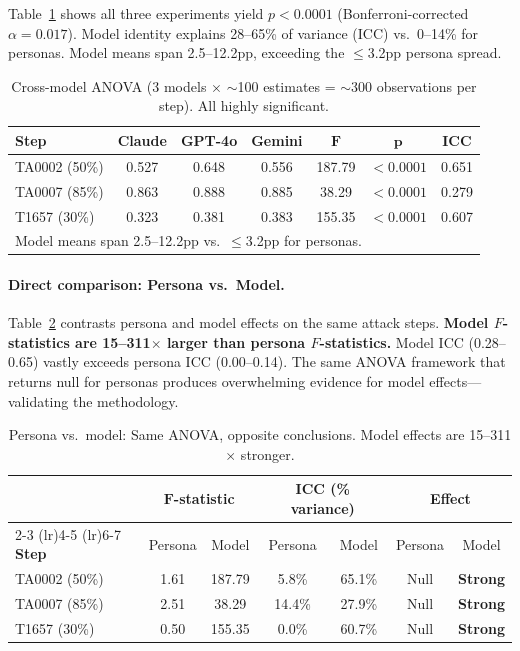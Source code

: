 Table~\ref{tab:cross-model} shows all three experiments yield $p < 0.0001$ (Bonferroni-corrected $\alpha = 0.017$). Model identity explains 28--65\% of variance (ICC) vs.\ 0--14\% for personas. Model means span 2.5--12.2pp,  exceeding the $\leq$3.2pp persona spread.

\begin{table}[t]
\centering
\caption{Cross-model ANOVA (3 models $\times$ $\sim$100 estimates = $\sim$300 observations per step). All highly significant.}
\label{tab:cross-model}
\small
\begin{tabular}{lcccccc}
\toprule
\textbf{Step} & \textbf{Claude} & \textbf{GPT-4o} & \textbf{Gemini} & $\boldsymbol{F}$ & $\boldsymbol{p}$ & \textbf{ICC} \\
\midrule
TA0002 (50\%) & 0.527 & 0.648 & 0.556 & 187.79 & ${<}0.0001$ & 0.651 \\
TA0007 (85\%) & 0.863 & 0.888 & 0.885 & \phantom{0}38.29 & ${<}0.0001$ & 0.279 \\
T1657\phantom{0} (30\%) & 0.323 & 0.381 & 0.383 & 155.35 & ${<}0.0001$ & 0.607 \\
\midrule
\multicolumn{7}{l}{Model means span 2.5--12.2pp vs.\ $\leq$3.2pp for personas.} \\
\bottomrule
\end{tabular}
\end{table}

\paragraph{Direct comparison: Persona vs.\ Model.}
Table~\ref{tab:persona-vs-model} contrasts persona and model effects on the same attack steps. \textbf{Model $F$-statistics are 15--311$\times$ larger than persona $F$-statistics.} Model ICC (0.28--0.65) vastly exceeds persona ICC (0.00--0.14). The same ANOVA framework that returns null for personas produces overwhelming evidence for model effects---validating the methodology.

\begin{table}[t]
\centering
\caption{Persona vs.\ model: Same ANOVA, opposite conclusions. Model effects are 15--311$\times$ stronger.}
\label{tab:persona-vs-model}
\small
\begin{tabular}{lcccccc}
\toprule
 & \multicolumn{2}{c}{$\boldsymbol{F}$-statistic} & \multicolumn{2}{c}{\textbf{ICC (\% variance)}} & \multicolumn{2}{c}{\textbf{Effect}} \\
\cmidrule(lr){2-3} \cmidrule(lr){4-5} \cmidrule(lr){6-7}
\textbf{Step} & Persona & Model & Persona & Model & Persona & Model \\
\midrule
TA0002 (50\%) & 1.61 & 187.79 & 5.8\% & 65.1\% & Null & \textbf{Strong} \\
TA0007 (85\%) & 2.51 & \phantom{0}38.29 & 14.4\% & 27.9\% & Null & \textbf{Strong} \\
T1657\phantom{0} (30\%) & 0.50 & 155.35 & 0.0\% & 60.7\% & Null & \textbf{Strong} \\
\bottomrule
\end{tabular}
\end{table}


